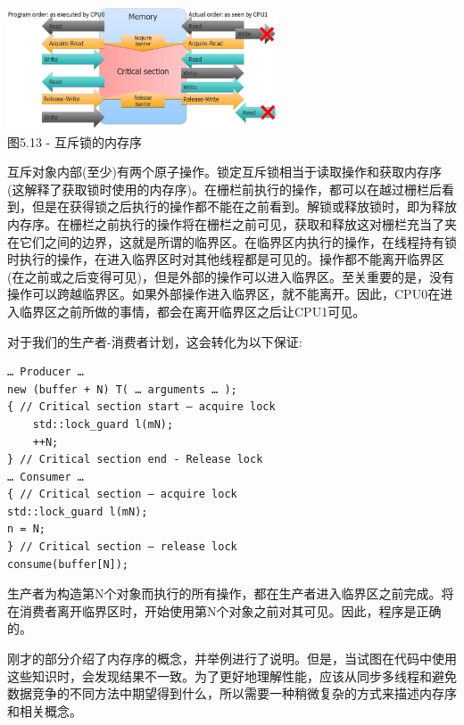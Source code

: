 \begin{center}
\includegraphics[width=0.6\textwidth]{content/1/chapter5/images/13.jpg}\\
图5.13 - 互斥锁的内存序
\end{center}

互斥对象内部(至少)有两个原子操作。锁定互斥锁相当于读取操作和获取内存序(这解释了获取锁时使用的内存序)。在栅栏前执行的操作，都可以在越过栅栏后看到，但是在获得锁之后执行的操作都不能在之前看到。解锁或释放锁时，即为释放内存序。在栅栏之前执行的操作将在栅栏之前可见，获取和释放这对栅栏充当了夹在它们之间的边界，这就是所谓的临界区。在临界区内执行的操作，在线程持有锁时执行的操作，在进入临界区时对其他线程都是可见的。操作都不能离开临界区(在之前或之后变得可见)，但是外部的操作可以进入临界区。至关重要的是，没有操作可以跨越临界区。如果外部操作进入临界区，就不能离开。因此，CPU0在进入临界区之前所做的事情，都会在离开临界区之后让CPU1可见。

对于我们的生产者-消费者计划，这会转化为以下保证:

\begin{lstlisting}[style=styleCXX]
… Producer …
new (buffer + N) T( … arguments … );
{ // Critical section start – acquire lock
	std::lock_guard l(mN);
	++N;
} // Critical section end - Release lock
… Consumer …
{ // Critical section – acquire lock
std::lock_guard l(mN);
n = N;
} // Critical section – release lock
consume(buffer[N]);
\end{lstlisting}

生产者为构造第N个对象而执行的所有操作，都在生产者进入临界区之前完成。将在消费者离开临界区时，开始使用第N个对象之前对其可见。因此，程序是正确的。

刚才的部分介绍了内存序的概念，并举例进行了说明。但是，当试图在代码中使用这些知识时，会发现结果不一致。为了更好地理解性能，应该从同步多线程和避免数据竞争的不同方法中期望得到什么，所以需要一种稍微复杂的方式来描述内存序和相关概念。




































